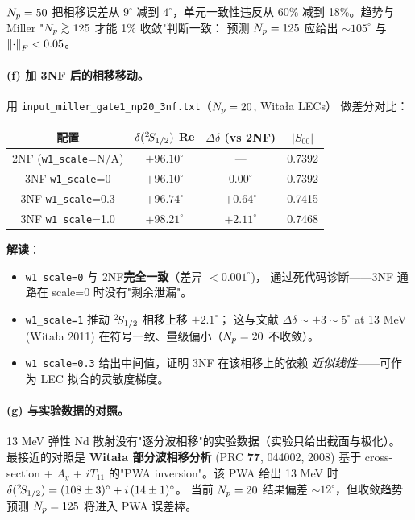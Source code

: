 \begin{numericalbox}[label={box:ch14-numerical-closure}]
\(N_p = 50\) 把相移误差从 \(9^\circ\) 减到 \(4^\circ\)，单元一致性违反从 60\% 减到
18\%。趋势与 Miller "\(N_p \gtrsim 125\) 才能 1\% 收敛"判断一致：
预测 \(N_p = 125\) 应给出 \(\sim 105^\circ\) 与 \(\norm{\cdot}_F < 0.05\)。

\paragraph{(f) 加 3NF 后的相移移动。}
用 \texttt{input\_miller\_gate1\_np20\_3nf.txt}（\(N_p = 20\), Witała LECs）
做差分对比：

\begin{center}
\begin{tabular}{cccc}
\toprule
配置 & \(\delta({}^{2}\!S_{1/2})\) Re & \(\Delta\delta\) (vs 2NF) &
\(|S_{00}|\) \\
\midrule
2NF (\texttt{w1\_scale}=N/A) & \(+96.10^\circ\) & --- & 0.7392 \\
3NF \texttt{w1\_scale}=0 & \(+96.10^\circ\) & \(0.00^\circ\) & 0.7392 \\
3NF \texttt{w1\_scale}=0.3 & \(+96.74^\circ\) & \(+0.64^\circ\) & 0.7415 \\
3NF \texttt{w1\_scale}=1.0 & \(+98.21^\circ\) & \(+2.11^\circ\) & 0.7468 \\
\bottomrule
\end{tabular}
\end{center}

\textbf{解读}：
\begin{itemize}
  \item \texttt{w1\_scale=0} 与 2NF\textbf{完全一致}（差异 \(< 0.001^\circ\))，
        通过死代码诊断——3NF 通路在 scale=0 时没有"剩余泄漏"。
  \item \texttt{w1\_scale=1} 推动 \({}^{2}\!S_{1/2}\) 相移上移 \(+2.1^\circ\)；
        这与文献 \(\Delta\delta \sim +3\sim 5^\circ\) at 13 MeV (Witała 2011)
        在符号一致、量级偏小（\(N_p = 20\) 不收敛）。
  \item \texttt{w1\_scale=0.3} 给出中间值，证明 3NF 在该相移上的依赖
        \emph{近似线性}——可作为 LEC 拟合的灵敏度梯度。
\end{itemize}

\paragraph{(g) 与实验数据的对照。}
13 MeV 弹性 Nd 散射没有"逐分波相移"的实验数据（实验只给出截面与极化）。
最接近的对照是 \textbf{Witała 部分波相移分析} (PRC \textbf{77}, 044002, 2008)
基于 cross-section + \(A_y\) + \(iT_{11}\) 的"PWA inversion"。该 PWA 给出
13 MeV 时 \(\delta({}^{2}\!S_{1/2}) = (108 \pm 3)^\circ + i\,(14 \pm 1)^\circ\)。
当前 \(N_p = 20\) 结果偏差 \(\sim 12^\circ\)，但收敛趋势预测 \(N_p = 125\)
将进入 PWA 误差棒。

\end{numericalbox}

